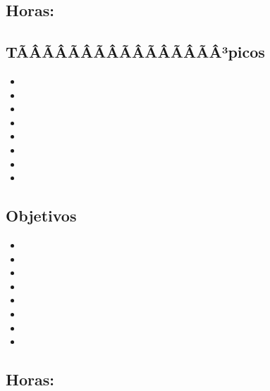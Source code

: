 \subsection{\ALDOSDef}\label{sec:BOK-AL2}
\subsection*{Horas: \ALDOSHours}

\subsection*{TÃÂÃÂÃÂÃÂÃÂÃÂÃÂÃÂ³picos}
\begin{itemize}
	\item \ALDOSTopicAlgoritmos
	\item \ALDOSTopicAlgoritmosgolosos
	\item \ALDOSTopicDividir
	\item \ALDOSTopicRegresion
	\item \ALDOSTopicBifurcacion
	\item \ALDOSTopicHeuristicas
	\item \ALDOSTopicCasamiento
	\item \ALDOSTopicAlgoritmosde
\end{itemize}

\subsection*{Objetivos}
\begin{itemize}
	\item \ALDOSObjUNO
	\item \ALDOSObjDOS
	\item \ALDOSObjTRES
	\item \ALDOSObjCUATRO
	\item \ALDOSObjCINCO
	\item \ALDOSObjSEIS
	\item \ALDOSObjSIETE
	\item \ALDOSObjOCHO
\end{itemize}

\subsection{\ALTRESDef}\label{sec:BOK-AL3}
\subsection*{Horas: \ALTRESHours}

